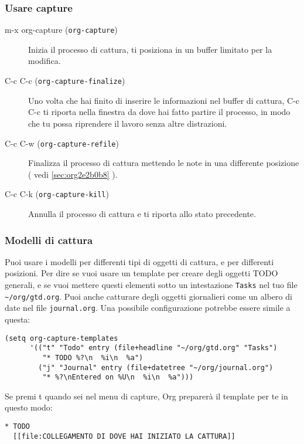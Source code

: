 \documentclass[11pt]{article}
\begin{document}
\subsubsection*{Usare capture}
\label{sec:orgeebb5f4}
\begin{description}
\item[{m-x org-capture (\texttt{org-capture})}] Inizia il processo di cattura, ti posiziona in un buffer limitato
per la modifica.

\item[{C-c C-c (\texttt{org-capture-finalize})}] Uno volta che hai finito di inserire le informazioni nel buffer di
cattura, C-c C-c ti riporta nella finestra da dove hai
fatto partire il processo, in modo che tu possa riprendere il lavoro
senza altre distrazioni.

\item[{C-c C-w (\texttt{org-capture-refile})}] Finalizza il processo di cattura mettendo le note in una
differente posizione ( vedi \ref{sec:org2e2b0b8} ).

\item[{C-c C-k (\texttt{org-capture-kill})}] Annulla il processo di cattura e ti riporta allo stato precedente.
\end{description}

\subsubsection*{Modelli di cattura}
\label{sec:orga0098a0}
Puoi usare i modelli per differenti tipi di oggetti di cattura, e per
differenti posizioni. Per dire se vuoi usare un template per creare
degli oggetti TODO generali, e se vuoi mettere questi elementi sotto
un intestazione \texttt{Tasks} nel tuo file \texttt{\textasciitilde{}/org/gtd.org}. Puoi anche
catturare degli oggetti giornalieri come un albero di date nel file
\texttt{journal.org}. Una possibile configurazione potrebbe essere simile a
questa:

\begin{verbatim}
(setq org-capture-templates
      '(("t" "Todo" entry (file+headline "~/org/gtd.org" "Tasks")
         "* TODO %?\n  %i\n  %a")
        ("j" "Journal" entry (file+datetree "~/org/journal.org")
         "* %?\nEntered on %U\n  %i\n  %a")))
\end{verbatim}

Se premi t quando sei nel menu di capture, Org preparerà il
template per te in questo modo:

\begin{verbatim}
* TODO
  [[file:COLLEGAMENTO DI DOVE HAI INIZIATO LA CATTURA]]
\end{verbatim}
\end{document}
